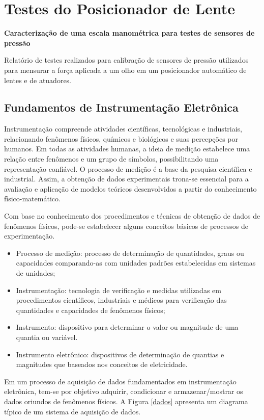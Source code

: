 
\chapter[Testes do Posicionador de Lente]{Testes do Posicionador de Lente}

 \textbf{\Large \center Caracterização de uma escala manométrica para testes de sensores de pressão}

Relatório de testes realizados para calibração de sensores de pressão utilizados para mensurar a força aplicada a um olho em um posicionador automático de lentes e de atuadores. 

\section[Fundamentos de Instrumentação Eletrônica]{Fundamentos de Instrumentação Eletrônica}

Instrumentação compreende atividades científicas, tecnológicas e industriais, relacionando fenômenos físicos, químicos e biológicos e suas percepções por humanos. Em todas as atividades humanas, a ideia de medição estabelece uma relação entre fenômenos e um grupo de símbolos, possibilitando uma representação confiável. O processo de medição é a base da pesquisa científica e industrial. Assim, a obtenção de dados experimentais trona-se essencial para a avaliação e aplicação de modelos teóricos desenvolvidos a partir do conhecimento físico-matemático.

Com base no conhecimento dos procedimentos e técnicas de obtenção de dados de fenômenos físicos, pode-se estabelecer alguns conceitos básicos de processos de experimentação.
\begin{itemize}
\item Processo de medição: processo de determinação de quantidades, graus ou capacidades comparando-as com unidades padrões estabelecidas em sistemas de unidades;
\item Instrumentação: tecnologia de verificação e medidas utilizadas em procedimentos científicos, industriais e médicos para verificação das quantidades e capacidades de fenômenos físicos;
\item Instrumento: dispositivo para determinar o valor ou magnitude de uma quantia ou variável.
\item Instrumento eletrônico: dispositivos de determinação de quantias e magnitudes que baseados nos conceitos de eletricidade.
\end{itemize}

Em um processo de aquisição de dados fundamentados em instrumentação eletrônica, tem-se por objetivo adquirir, condicionar e armazenar/mostrar os dados oriundos de fenômenos físicos. A Figura \ref{dados} apresenta um diagrama típico de um sistema de aquisição de dados.

